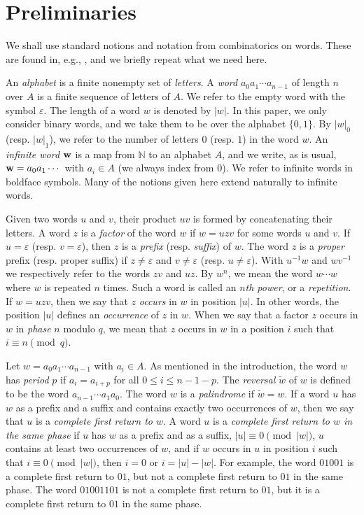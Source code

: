 \documentclass[a4paper,fleqn]{article}
\providecommand{\abs}[1]{\lvert#1\rvert}
\newcommand{\infw}[1]{%
  \ifcat\noexpand#1\relax\bm{#1}%
  \else\mathbf{#1}\fi}          %
\newcommand{\mirror}[1]{\widetilde{#1}}
\newcommand{\N}{\mathbb{N}}
\begin{document}
  \section{Preliminaries}\label{sec:preliminaries}
  We shall use standard notions and notation from combinatorics on words. These are found in, e.g.,
  \cite{2002:algebraic_combinatorics_on_words}, and we briefly repeat what we need here.

  An \emph{alphabet} is a finite nonempty set of \emph{letters}. A \emph{word} $a_0 a_1 \cdots a_{n-1}$ of length $n$
  over $A$ is a finite sequence of letters of $A$. We refer to the empty word with the symbol $\varepsilon$. The length
  of a word $w$ is denoted by $\abs{w}$. In this paper, we only consider binary words, and we take them to be over the
  alphabet $\{0, 1\}$. By $\abs{w}_0$ (resp. $\abs{w}_1$), we refer to the number of letters $0$ (resp. $1$) in the
  word $w$. An \emph{infinite word} $\infw{w}$ is a map from $\N$ to an alphabet $A$, and we write, as is usual,
  $\infw{w} = a_0 a_1 \cdots$ with $a_i \in A$ (we always index from $0$). We refer to infinite words in boldface
  symbols. Many of the notions given here extend naturally to infinite words.

  Given two words $u$ and $v$, their product $uv$ is formed by concatenating their letters. A word $z$ is a
  \emph{factor} of the word $w$ if $w = uzv$ for some words $u$ and $v$. If $u = \varepsilon$ (resp.
  $v = \varepsilon$), then $z$ is a \emph{prefix} (resp. \emph{suffix}) of $w$. The word $z$ is a \emph{proper} prefix
  (resp. proper suffix) if $z \neq \varepsilon$ and $v \neq \varepsilon$ (resp. $u \neq \varepsilon$). With $u^{-1}w$
  and $wv^{-1}$ we respectively refer to the words $zv$ and $uz$. By $w^n$, we mean the word $w \cdots w$ where $w$ is
  repeated $n$ times. Such a word is called an \emph{$n$th power}, or a \emph{repetition}. If $w = uzv$, then we say
  that $z$ \emph{occurs} in $w$ in position $\abs{u}$. In other words, the position $\abs{u}$ defines an
  \emph{occurrence} of $z$ in $w$. When we say that a factor $z$ occurs in $w$ in \emph{phase} $n$ modulo $q$, we mean
  that $z$ occurs in $w$ in a position $i$ such that $i \equiv n \pmod{q}$.

  Let $w = a_0 a_1 \cdots a_{n-1}$ with $a_i \in A$. As mentioned in the introduction, the word $w$ has \emph{period}
  $p$ if $a_i = a_{i+p}$ for all $0 \leq i \leq n - 1 - p$. The \emph{reversal} $\mirror{w}$ of $w$ is defined to be
  the word $a_{n-1} \cdots a_1 a_0$. The word $w$ is a \emph{palindrome} if $\mirror{w} = w$. If a word $u$ has $w$ as
  a prefix and a suffix and contains exactly two occurrences of $w$, then we say that $u$ is a \emph{complete first
  return to $w$}. A word $u$ is a \emph{complete first return to $w$ in the same phase} if $u$ has $w$ as a prefix and
  as a suffix, $\abs{u} \equiv 0 \pmod{\abs{w}}$, $u$ contains at least two occurrences of $w$, and if $w$ occurs in
  $u$ in position $i$ such that $i \equiv 0 \pmod{\abs{w}}$, then $i = 0$ or $i = \abs{u} - \abs{w}$. For example, the
  word $01001$ is a complete first return to $01$, but not a complete first return to $01$ in the same phase. The word
  $01001101$ is not a complete first return to $01$, but it is a complete first return to $01$ in the same phase.
\end{document}
